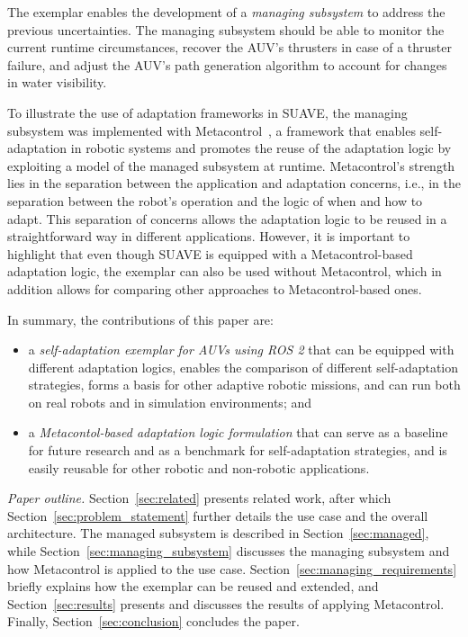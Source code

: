 The exemplar enables the development of a \emph{managing subsystem} to
address the previous uncertainties. The managing subsystem should be
able to monitor the current runtime circumstances, recover the AUV's
thrusters in case of a thruster failure, and adjust the AUV's path
generation algorithm to account for changes in water visibility.

To illustrate the use of adaptation frameworks in SUAVE, the
managing subsystem was implemented with
Metacontrol~\cite{corbato2013model,bozhinoski2022mros}, a framework
that enables self-adaptation in robotic systems and promotes the reuse
of the adaptation logic by exploiting a model of the managed subsystem
at runtime. Metacontrol's strength lies in the separation between the
application and adaptation concerns, i.e., in the separation between
the robot's operation and the logic of when and how to adapt.  This
separation of concerns allows the adaptation logic to be reused in a
straightforward way in different applications.  However, it is
important to highlight that even though SUAVE is equipped with a
Metacontrol-based adaptation logic, the exemplar can also be used
without Metacontrol, which in addition allows for comparing other
approaches to Metacontrol-based ones.

In summary, the contributions of this paper are:
\begin{itemize}
\item a \emph{self-adaptation exemplar for AUVs using ROS 2} that can
  be equipped with different adaptation logics, enables the comparison
  of different self-adaptation strategies, forms a basis for other
  adaptive robotic missions, and can run both on real robots and in
  simulation environments; and
\item a \emph{Metacontol-based adaptation logic formulation} that can
  serve as a baseline for future research and as a benchmark for
  self-adaptation strategies, and is easily reusable for other robotic
  and non-robotic applications.
\end{itemize}

\emph{Paper outline.}  Section~\ref{sec:related} presents related
work, after which Section~\ref{sec:problem_statement} further details
the use case and the overall architecture. The managed subsystem is
described in Section~\ref{sec:managed}, while
Section~\ref{sec:managing_subsystem} discusses the managing subsystem
and how Metacontrol is applied to the use
case. Section~\ref{sec:managing_requirements} briefly explains how the
exemplar can be reused and extended, and Section~\ref{sec:results}
presents and discusses the results of applying Metacontrol. Finally,
Section~\ref{sec:conclusion} concludes the paper.

